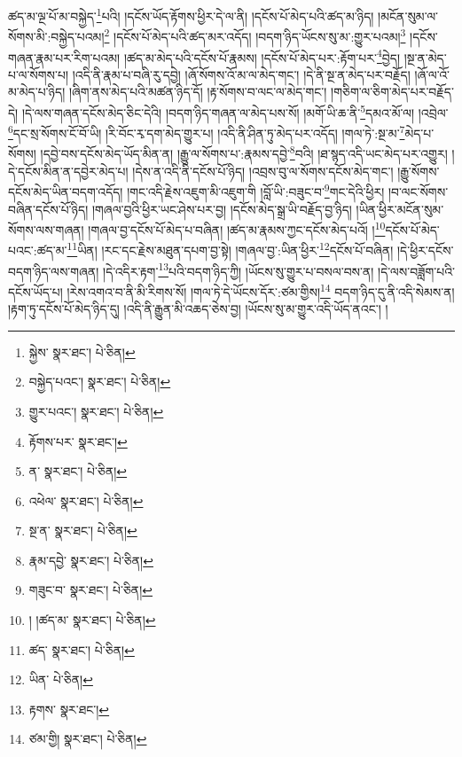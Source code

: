 ཚད་མ་ལྔ་པོ་མ་བསྐྱེད་\footnote{སྐྱེས་  སྣར་ཐང་།  པེ་ཅིན། }པའི། །དངོས་ཡོད་རྟོགས་ཕྱིར་དེ་ལ་ནི། །དངོས་པོ་མེད་པའི་ཚད་མ་ཉིད། །མངོན་སུམ་ལ་སོགས་མི་:བསྐྱེད་པའམ།\footnote{བསྐྱེད་པའང་།  སྣར་ཐང་།  པེ་ཅིན། } །དངོས་པོ་མེད་པའི་ཚད་མར་འདོད། །བདག་ཉིད་ཡོངས་སུ་མ་:གྱུར་པའམ།\footnote{གྱུར་པའང་།  སྣར་ཐང་།  པེ་ཅིན། } །དངོས་གཞན་རྣམ་པར་རིག་པའམ། །ཚད་མ་མེད་པའི་དངོས་པོ་རྣམས། །དངོས་པོ་མེད་པར་:རྟོག་པར་\footnote{རྟོགས་པར་  སྣར་ཐང་། }བྱེད། །སྔ་ན་མེད་པ་ལ་སོགས་པ། །འདི་ནི་རྣམ་པ་བཞི་རུ་དབྱེ། །ཞོ་སོགས་འོ་མ་ལ་མེད་གང་། །དེ་ནི་སྔ་ན་མེད་པར་བརྗོད། །ཞོ་ལ་འོ་མ་མེད་པ་ཉིད། །ཞིག་ནས་མེད་པའི་མཚན་ཉིད་དོ། །རྟ་སོགས་བ་ལང་ལ་མེད་གང་། །གཅིག་ལ་ཅིག་མེད་པར་བརྗོད་དེ། །དེ་ལས་གཞན་དངོས་མེད་ཅིང་དེའི། །བདག་ཉིད་གཞན་ལ་མེད་པས་སོ། །མགོ་ཡི་ཆ་ནི་\footnote{ན་  སྣར་ཐང་།  པེ་ཅིན། }དམའ་མོ་ལ། །འབྲེལ་\footnote{འཕེལ་  སྣར་ཐང་།  པེ་ཅིན། }དང་སྲ་སོགས་ངོ་བོ་ཡི། །རི་བོང་རྭ་དག་མེད་གྱུར་པ། །འདི་ནི་ཤིན་ཏུ་མེད་པར་འདོད། །གལ་ཏེ་:སྔ་མ་\footnote{སྔ་ན་  སྣར་ཐང་།  པེ་ཅིན། }མེད་པ་སོགས། །དབྱེ་བས་དངོས་མེད་ཡོད་མིན་ན། །རྒྱུ་ལ་སོགས་པ་:རྣམས་དབྱེ་\footnote{རྣམ་དབྱེ་  སྣར་ཐང་།  པེ་ཅིན། }བའི། །ཐ་སྙད་འདི་ཡང་མེད་པར་འགྱུར། །དེ་དངོས་མིན་ན་དབྱེར་མེད་པ། །དེས་ན་འདི་ནི་དངོས་པོ་ཉིད། །འབྲས་བུ་ལ་སོགས་དངོས་མེད་གང་། །རྒྱུ་སོགས་དངོས་མེད་ཡིན་བདག་འདོད། །གང་འདི་རྗེས་འཇུག་མི་འཇུག་གི །བློ་ཡི་:བཟུང་བ་\footnote{གཟུང་བ་  སྣར་ཐང་།  པེ་ཅིན། }གང་དེའི་ཕྱིར། །བ་ལང་སོགས་བཞིན་དངོས་པོ་ཉིད། །གཞལ་བྱའི་ཕྱིར་ཡང་ཤེས་པར་བྱ། །དངོས་མེད་སྒྲ་ཡི་བརྗོད་བྱ་ཉིད། །ཡིན་ཕྱིར་མངོན་སུམ་སོགས་ལས་གཞན། །གཞལ་བྱ་དངོས་པོ་མེད་པ་བཞིན། །ཚད་མ་རྣམས་ཀྱང་དངོས་མེད་པའོ། །\footnote{། །ཚད་མ་  སྣར་ཐང་།  པེ་ཅིན། }དངོས་པོ་མེད་པའང་:ཚད་མ་\footnote{ཚད་  སྣར་ཐང་།  པེ་ཅིན། }ཡིན། །རང་དང་རྗེས་མཐུན་དཔག་བྱ་སྟེ། །གཞལ་བྱ་:ཡིན་ཕྱིར་\footnote{ཡིན་  པེ་ཅིན། }དངོས་པོ་བཞིན། །དེ་ཕྱིར་དངོས་བདག་ཉིད་ལས་གཞན། །དེ་འདིར་རྟག་\footnote{རྟགས་  སྣར་ཐང་། }པའི་བདག་ཉིད་ཀྱི། །ཡོངས་སུ་གྱུར་པ་བསལ་བས་ན། །དེ་ལས་བཟློག་པའི་དངོས་ཡོད་པ། །རེས་འགའ་བ་ནི་མི་རིགས་སོ། །གལ་ཏེ་དེ་ཡོངས་དོར་:ཙམ་གྱིས།\footnote{ཙམ་གྱི།  སྣར་ཐང་།  པེ་ཅིན། } བདག་ཉིད་དུ་ནི་འདི་སེམས་ན། །རྟག་ཏུ་དངོས་པོ་མེད་ཉིད་དུ། །འདི་ནི་རྒྱུན་མི་འཆད་ཅེས་བྱ། །ཡོངས་སུ་མ་གྱུར་འདི་ཡོད་ནའང་། །
